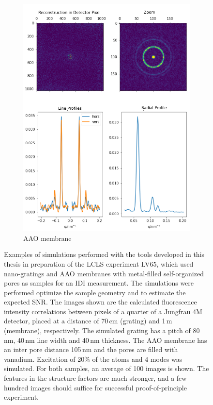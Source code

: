 \begin{figure}[H]
\begin{subfigure}[b]{0.37\textwidth}
		\includegraphics[width=\linewidth]{images/lv65simB.pdf}
		\caption{AAO membrane }
		\label{fig:outlook_aao}
	\end{subfigure}
	\caption[Simulations in preparation of LCLS experiment]{Examples of simulations performed with the tools developed in this thesis in preparation of the LCLS experiment LV65, which used nano-gratings and AAO membranes with metal-filled self-organized pores as samples for an IDI measurement. The simulations were performed optimize the sample geometry and to estimate the expected SNR. The images shown are the calculated fluorescence intensity correlations between pixels of a quarter of a Jungfrau 4M detector, placed at a distance of 70\,cm (grating) and 1\,m (membrane), respectively. The simulated grating has a pitch of 80\,nm, 40\,nm line width and 40\,nm thickness. The AAO membrane has an inter pore distance 105\,nm and the pores are filled with vanadium. Excitation of 20\% of the atoms and 4 modes was simulated. For both samples, an average of 100 images is shown. The features in the structure factors are much stronger, and a few hundred images should suffice for successful proof-of-principle experiment.}
\end{figure}
